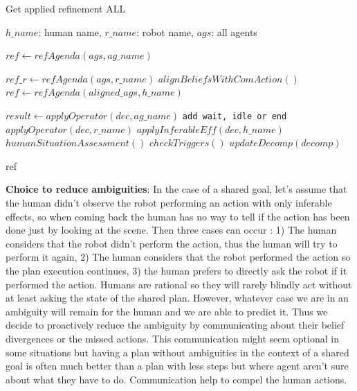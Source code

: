 \documentclass[letterpaper]{article} %
\begin{document}
\begin{algorithm}
\caption{Get applied refinement ALL}\label{alg:ap_ref_all}
\begin{algorithmic}
\Require $h\_name$: human name, $r\_name$: robot name, $ags$: all agents

\State $ref \gets refAgenda(ags, ag\_name)$

\State $ref\_r \gets refAgenda(ags, r\_name)$ 
 
    \State $alignBeliefsWithComAction()$
    \State $ref \gets refAgenda(aligned\_ags, h\_name)$
\EndIf


    \State $result \gets applyOperator(dec, ag\_name)$ 
        \State \texttt{add wait, idle or end}
    \Else
        \State $applyOperator(dec, r\_name)$ 
        \State $applyInferableEff(dec, h\_name)$ 
        \State $humanSituationAssessment()$
        \State $checkTriggers()$
        \State $updateDecomp(decomp)$
    \EndIf
\EndFor

\State \Return ref

\end{algorithmic}
\end{algorithm}

\textbf{Choice to reduce ambiguities}:
In the case of a shared goal, let's assume that the human didn't observe the robot performing an action with only inferable effects, so when coming back the human has no way to tell if the action has been done just by looking at the scene. Then three cases can occur : 1) The human considers that the robot didn't perform the action, thus the human will try to perform it again, 2) The human considers that the robot performed the action so the plan execution continues, 3) the human prefers to directly ask the robot if it performed the action. 
Humans are rational so they will rarely blindly act without at least asking the state of the shared plan. However, whatever case we are in an ambiguity will remain for the human and we are able to predict it. Thus we decide to proactively reduce the ambiguity by communicating about their belief divergences or the missed actions. This communication might seem optional in some situations but having a plan without ambiguities in the context of a shared goal is often much better than a plan with less steps but where agent aren't sure about what they have to do. Communication help to compel the human actions.
\end{document}
